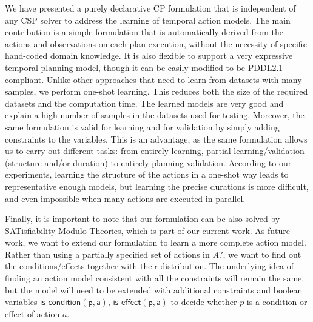 \documentclass[runningheads]{llncs}
\begin{document}
We have presented a purely declarative CP formulation that is independent of any CSP solver to address the learning of temporal action models.
The main contribution is a simple formulation that is automatically derived from the actions and observations on each plan execution, without the necessity of specific hand-coded domain knowledge. It is also flexible to support a very expressive temporal planning model, though it can be easily modified to be PDDL2.1-compliant.
Unlike other approaches that need to learn from datasets with many samples, we perform one-shot learning. This reduces both the size of the required datasets and the computation time. The learned models are very good and explain a high number of samples in the datasets used for testing. Moreover, the same formulation is valid for learning and for validation by simply adding constraints to the variables. This is an advantage, as the same formulation allows us to carry out different tasks: from entirely learning, partial learning/validation (structure and/or duration) to entirely planning validation.
According to our experiments, learning the structure of the actions in a one-shot way leads to representative enough models, but learning the precise durations is more difficult, and even impossible when many actions are executed in parallel.


Finally, it is important to note that our formulation can be also solved by SATisfiability Modulo Theories, which is part of our current work. As future work, we want to extend our formulation to learn a more complete action model. Rather than using a partially specified set of actions in $A?$, we want to find out the conditions/effects together with their distribution.
The underlying idea of finding an action model consistent with all the constraints will remain the same, but the model will need to be extended with additional constraints and boolean variables $\mathsf{is\_condition(p,a)}$, $\mathsf{is\_effect(p,a)}$ to decide whether $p$ is a condition or effect of action $a$.


















%
%
%


%
\end{document}
